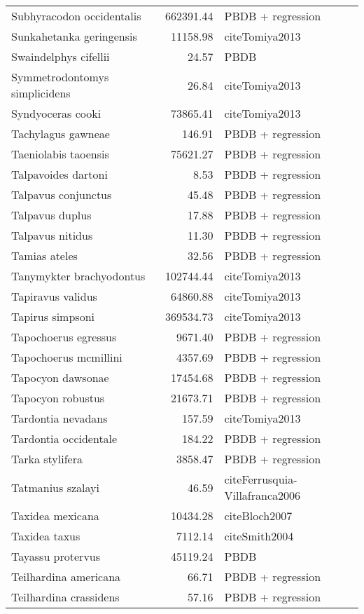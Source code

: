 \begin{table}[ht]
\begin{tabular}{lrl}
  Subhyracodon occidentalis & 662391.44 & PBDB + regression \\ 
  Sunkahetanka geringensis & 11158.98 & cite{Tomiya2013} \\ 
  Swaindelphys cifellii & 24.57 & PBDB \\ 
  Symmetrodontomys simplicidens & 26.84 & cite{Tomiya2013} \\ 
  Syndyoceras cooki & 73865.41 & cite{Tomiya2013} \\ 
  Tachylagus gawneae & 146.91 & PBDB + regression \\ 
  Taeniolabis taoensis & 75621.27 & PBDB + regression \\ 
  Talpavoides dartoni & 8.53 & PBDB + regression \\ 
  Talpavus conjunctus & 45.48 & PBDB + regression \\ 
  Talpavus duplus & 17.88 & PBDB + regression \\ 
  Talpavus nitidus & 11.30 & PBDB + regression \\ 
  Tamias ateles & 32.56 & PBDB + regression \\ 
  Tanymykter brachyodontus & 102744.44 & cite{Tomiya2013} \\ 
  Tapiravus validus & 64860.88 & cite{Tomiya2013} \\ 
  Tapirus simpsoni & 369534.73 & cite{Tomiya2013} \\ 
  Tapochoerus egressus & 9671.40 & PBDB + regression \\ 
  Tapochoerus mcmillini & 4357.69 & PBDB + regression \\ 
  Tapocyon dawsonae & 17454.68 & PBDB + regression \\ 
  Tapocyon robustus & 21673.71 & PBDB + regression \\ 
  Tardontia nevadans & 157.59 & cite{Tomiya2013} \\ 
  Tardontia occidentale & 184.22 & PBDB + regression \\ 
  Tarka stylifera & 3858.47 & PBDB + regression \\ 
  Tatmanius szalayi & 46.59 & cite{Ferrusquia-Villafranca2006} \\ 
  Taxidea mexicana & 10434.28 & cite{Bloch2007} \\ 
  Taxidea taxus & 7112.14 & cite{Smith2004} \\ 
  Tayassu protervus & 45119.24 & PBDB \\ 
  Teilhardina americana & 66.71 & PBDB + regression \\ 
  Teilhardina crassidens & 57.16 & PBDB + regression \\ 

\end{tabular}
\end{table}
